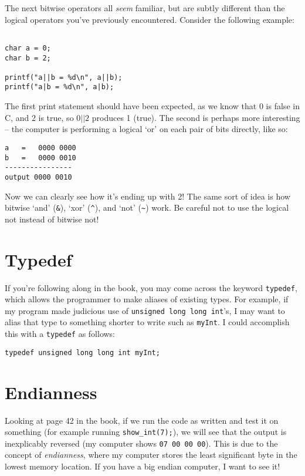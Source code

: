 \documentclass[10pt]{article}
\begin{document}
The next bitwise operators all \textit{seem} familiar, but are subtly different than the logical operators you've previously encountered. Consider the following example:

\begin{lstlisting}

char a = 0;
char b = 2;

printf("a||b = %d\n", a||b);
printf("a|b = %d\n", a|b);

\end{lstlisting}


The first print statement should have been expected, as we know that 0 is false in C, and 2 is true, so $0||2$ produces 1 (true). The second is perhaps more interesting -- the computer is performing a logical `or' on each pair of bits directly, like so:

\begin{lstlisting}
a   =   0000 0000
b   =   0000 0010
----------------
output 0000 0010
\end{lstlisting}

Now we can clearly see how it's ending up with 2! The same sort of idea is how bitwise `and' (\texttt{\&}), `xor' (\texttt{\^}), and `not' (\texttt{\~}) work. Be careful not to use the logical not instead of bitwise not!

\section*{Typedef}

If you're following along in the book, you may come across the keyword \texttt{typedef}, which allows the programmer to make aliases of existing types. For example, if my program made judicious use of \texttt{unsigned long long int}'s, I may want to alias that type to something shorter to write such as \texttt{myInt}. I could accomplish this with a \texttt{typedef} as follows:

\begin{lstlisting}
typedef unsigned long long int myInt;
\end{lstlisting}


\section*{Endianness}
Looking at page 42 in the book, if we run the code as written and test it on something (for example running \texttt{show\_int(7);}), we will see that the output is inexplicably reversed (my computer shows \texttt{07 00 00 00}). This is due to the concept of \textit{endianness}, where my computer stores the least significant byte in the lowest memory location. If you have a big endian computer, I want to see it!
\end{document}
